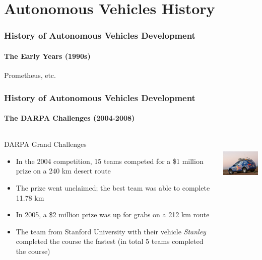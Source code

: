\section{Autonomous Vehicles History}

\begin{frame}
\frametitle{History of Autonomous Vehicles Development}
\framesubtitle{The Early Years (1990s)}
Prometheus, etc.
\end{frame}

\begin{frame}
\frametitle{History of Autonomous Vehicles Development}
\framesubtitle{The DARPA Challenges (2004-2008)}
\begin{columns}[T]
    \begin{column}{.65\textwidth}
    DARPA Grand Challenges\footnotemark
    \begin{itemize}
        \item In the 2004 competition, 15 teams competed for a \$1 million prize
            on a 240 km desert route
        \item The prize went unclaimed; the best team was able to complete
            11.78 km
        \item In 2005, a \$2 million prize was up for grabs on a 212 km route
        \item The team from Stanford University with their vehicle
            \emph{Stanley} completed the course the fastest (in total 5 teams
            completed the course)
    \end{itemize}
    \end{column}
    \begin{column}{.35\textwidth}
    \centering
    \includegraphics[height=2.5cm]{images/darpa_stanley.jpg} \\
    \tiny{\cite{DARPAStanley}}
    \end{column}
\end{columns}
\end{frame}
    
